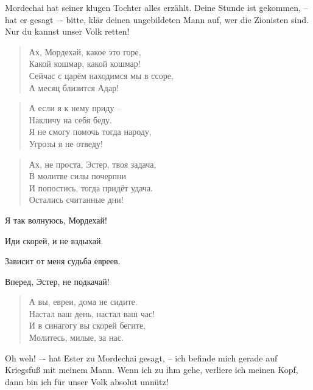 \documentclass[12pt,a4paper,titlepage]{article}
\begin{document}
\begin{drama}
\uespeaks
Mordechai hat seiner klugen Tochter alles erzählt. Deine Stunde
ist gekommen, -- hat er gesagt –- bitte, klär deinen ungebildeten Mann auf,
wer die Zionisten sind. Nur du kannst unser Volk retten!

\espeaks {}
\begin{verse}
Ах, Мордехай, какое это горе,\\
Какой кошмар, какой кошмар!\\
Сейчас с царём находимся мы в ссоре,\\
А месяц близится Адар!\\
\end{verse}

\begin{verse}
А если я к нему приду --\\
Накличу на себя беду.\\
Я не смогу помочь тогда народу,\\
Угрозы я не отведу!\\
\end{verse}


\mspeaks {}
\begin{verse}
Ах, не проста, Эстер, твоя задача,\\
В молитве силы почерпни\\
И попостись, тогда придёт удача.\\
Остались считанные дни!\\
\end{verse}

Я так волнуюсь, Мордехай!

Иди скорей, и не вздыхай.

Зависит от меня судьба евреев.

Вперед, Эстер, не подкачай!


\mspeaks
\begin{verse}
А вы, евреи, дома не сидите.\\
Настал ваш день, настал ваш час!\\
И в синагогу вы скорей бегите,\\
Молитесь, милые, за нас.\\
\end{verse}



\uespeaks
Oh weh! –- hat Ester zu Mordechai gesagt, -- ich befinde mich
gerade auf Kriegsfuß mit meinem Mann. Wenn ich zu ihm gehe,
verliere ich meinen Kopf, dann bin ich für unser Volk absolut unnütz!


\end{drama}
\end{document}
